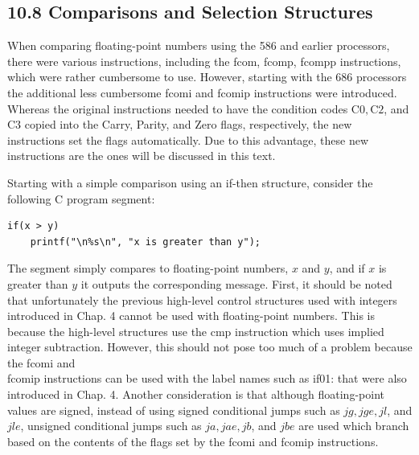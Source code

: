 \documentclass[10pt]{book}
\begin{document}
\subsection*{10.8 Comparisons and Selection Structures}
When comparing floating-point numbers using the 586 and earlier processors, there were various instructions, including the fcom, fcomp, fcompp instructions, which were rather cumbersome to use. However, starting with the 686 processors the additional less cumbersome fcomi and fcomip instructions were introduced. Whereas the original instructions needed to have the condition codes $\mathrm{C} 0, \mathrm{C} 2$, and C3 copied into the Carry, Parity, and Zero flags, respectively, the new instructions set the flags automatically. Due to this advantage, these new instructions are the ones will be discussed in this text.

Starting with a simple comparison using an if-then structure, consider the following C program segment:

\begin{verbatim}
if(x > y)
    printf("\n%s\n", "x is greater than y");
\end{verbatim}

The segment simply compares to floating-point numbers, $x$ and $y$, and if $x$ is greater than $y$ it outputs the corresponding message. First, it should be noted that unfortunately the previous high-level control structures used with integers introduced in Chap. 4 cannot be used with floating-point numbers. This is because the high-level structures use the cmp instruction which uses implied integer subtraction. However, this should not pose too much of a problem because the fcomi and\\
fcomip instructions can be used with the label names such as if01: that were also introduced in Chap. 4. Another consideration is that although floating-point values are signed, instead of using signed conditional jumps such as $j g, j g e, j l$, and $j l e$, unsigned conditional jumps such as $j a, j a e, j b$, and $j b e$ are used which branch based on the contents of the flags set by the fcomi and fcomip instructions.
\end{document}

